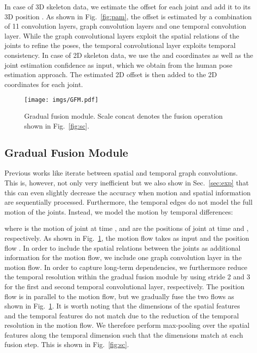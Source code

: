 \documentclass[letterpaper, 10 pt, conference]{ieeeconf}
\begin{document}
In case of 3D skeleton data, we estimate the offset  for each joint and add it to its 3D position  . As shown in Fig.~\ref{fig:pam}, the offset is estimated by a combination of 11 convolution layers, graph convolution layers and one temporal convolution layer. While the graph convolutional layers exploit the spatial relations of the joints to refine the poses, the temporal convolutional layer exploits temporal consistency. In case of 2D skeleton data, we use the  and  coordinates as well as the joint estimation confidence as input, which we obtain from the human pose estimation approach. The estimated 2D offset  is then added to the 2D coordinates for each joint. 




\begin{figure}[!htbp]
    \centering
    \texttt{[image: imgs/GFM.pdf]}
    \caption{Gradual fusion module. Scale concat denotes the fusion operation shown in Fig.~\ref{fig:sc}.}
    \label{fig:gfm}
    \vspace{-2mm}
\end{figure}

\subsection{Gradual Fusion Module}
Previous works like \cite{shi2019two} iterate between spatial and temporal graph convolutions. This is, however, not only very inefficient but we also show in Sec.~\ref{sec:exp} that this can even slightly decrease the accuracy when motion and spatial information are sequentially processed. Furthermore, the temporal edges do not model the full motion of the joints. Instead, we model the motion by temporal differences:

where  is the motion of joint  at time ,  and  are the positions of joint  at time  and , respectively. As shown in Fig.~\ref{fig:gfm}, the motion flow takes  as input and the position flow . In order to include the spatial relations between the joints as additional information for the motion flow, we include one graph convolution layer in the motion flow. In order to capture long-term dependencies, we furthermore reduce the temporal resolution within the gradual fusion module by using stride 2 and 3 for the first and second temporal convolutional layer, respectively. The position flow is in parallel to the motion flow, but we gradually fuse the two flows as shown in Fig.~\ref{fig:gfm}. It is worth noting that the dimensions of the spatial features and the temporal features do not match due to the reduction of the temporal resolution in the motion flow. We therefore perform max-pooling over the spatial features along the temporal dimension such that the dimensions match at each fusion step. This is shown in Fig.~\ref{fig:sc}.
\end{document}
